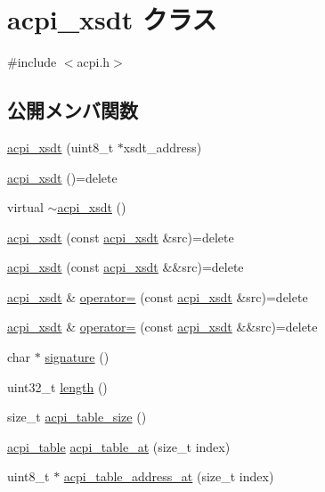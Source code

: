 \hypertarget{classacpi__xsdt}{}\section{acpi\+\_\+xsdt クラス}
\label{classacpi__xsdt}


{\ttfamily \#include $<$acpi.\+h$>$}

\subsection*{公開メンバ関数}
\begin{DoxyCompactItemize}
\item 
\hyperlink{classacpi__xsdt_a45f31058ad0b744f139f16d0d667ae79}{acpi\+\_\+xsdt} (uint8\+\_\+t $\ast$xsdt\+\_\+address)
\item 
\hyperlink{classacpi__xsdt_a0d97823b32d69e5523ffe223749f7e20}{acpi\+\_\+xsdt} ()=delete
\item 
virtual \hyperlink{classacpi__xsdt_a2ad4887e1b44d5de06d473851e446407}{$\sim$acpi\+\_\+xsdt} ()
\item 
\hyperlink{classacpi__xsdt_a7774cba5774ac30d78c0a2c3ba181901}{acpi\+\_\+xsdt} (const \hyperlink{classacpi__xsdt}{acpi\+\_\+xsdt} \&src)=delete
\item 
\hyperlink{classacpi__xsdt_a111850e71447f435e6dab860465772b4}{acpi\+\_\+xsdt} (const \hyperlink{classacpi__xsdt}{acpi\+\_\+xsdt} \&\&src)=delete
\item 
\hyperlink{classacpi__xsdt}{acpi\+\_\+xsdt} \& \hyperlink{classacpi__xsdt_a1a1897128b1afed0bd26d12465a4c98f}{operator=} (const \hyperlink{classacpi__xsdt}{acpi\+\_\+xsdt} \&src)=delete
\item 
\hyperlink{classacpi__xsdt}{acpi\+\_\+xsdt} \& \hyperlink{classacpi__xsdt_a058721e1a87b15e0939a1efa9d80b9e2}{operator=} (const \hyperlink{classacpi__xsdt}{acpi\+\_\+xsdt} \&\&src)=delete
\item 
char $\ast$ \hyperlink{classacpi__xsdt_a6da0f8215c9d893fc44ad8d88eacb335}{signature} ()
\item 
uint32\+\_\+t \hyperlink{classacpi__xsdt_a3f0e588ac85030abbd73fa724402f436}{length} ()
\item 
size\+\_\+t \hyperlink{classacpi__xsdt_a783b4ff904191b61a9a3aa363d5056ef}{acpi\+\_\+table\+\_\+size} ()
\item 
\hyperlink{acpi_8h_a64dfa94462992cc30eb68821513817ff}{acpi\+\_\+table} \hyperlink{classacpi__xsdt_a4d2326989b3fda0dbb32e480d2b92c97}{acpi\+\_\+table\+\_\+at} (size\+\_\+t index)
\item 
uint8\+\_\+t $\ast$ \hyperlink{classacpi__xsdt_a07d908cc4f42f15d3e4529b844763abc}{acpi\+\_\+table\+\_\+address\+\_\+at} (size\+\_\+t index)
\end{DoxyCompactItemize}


